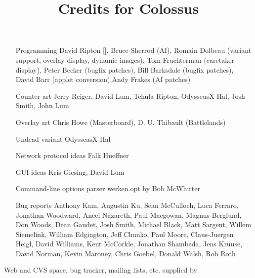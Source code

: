 \documentclass{article}
\begin{document}

\title{Credits for Colossus}

\maketitle

\begin{itemize}

\item[Programming] David Ripton [], Bruce Sherrod (AI), Romain Dolbeau (variant support, overlay display, dynamic images), Tom Fruchterman (caretaker display), Peter Becker (bugfix patches), Bill Barksdale (bugfix patches), David Barr (applet conversion),Andy Frakes (AI patches)

\item[Counter art] Jerry Reiger, David Lum, Tchula Ripton, OdysseusX Hal, Josh Smith, John Lum

\item[Overlay art] Chris Howe (Masterboard), D. U. Thibault (Battlelands)

\item[Undead variant] OdysseasX Hal

\item[Network protocol ideas] Falk Hueffner

\item[GUI ideas] Kris Giesing, David Lum

\item[Command-line options parser] werken.opt by Bob McWhirter

\item[Bug reports] Anthony Kam, Augustin Ku, Sean McCulloch, Luca Ferraro, Jonathan Woodward, Aneel Nazareth, Paul Macgowan, Magnus Berglund, Don Woods, Dean Gaudet, Josh Smith, Michael Black, Matt Sargent, Willem Siemelink, William Edgington, Jeff Chunko, Paul Moore, Claus-Juergen Heigl, David Williams, Kent McCorkle, Jonathan Shambeda, Jens Kruuse, David Norman, Kevin Maroney, Chris Goebel, Donald Walsh, Rob Roth


\end{itemize}

Web and CVS space, bug tracker, mailing lists, etc. supplied by 
\end{document}
